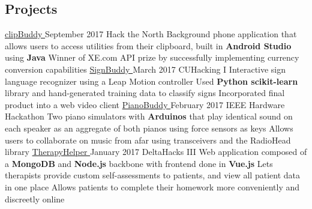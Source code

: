 \documentclass[]{aanguyen_res}
\begin{document}
\begin{main}
		\section{Projects}
			\mainentry%
				{\href{http://github.com/kumailn/clipBuddy}{clipBuddy {\faGithub}}}%
				{September 2017}%
				{Hack the North}%
				{}%
				{\faCaretRight Background phone application that allows users to access utilities from their clipboard, built in \textbf{Android Studio} using \textbf{Java}
				\faCaretRight Winner of XE.com API prize by successfully implementing currency conversion capabilities}
			\vspace{0.1cm}%
			\mainentry%
				{\href{http://github.com/aanguyen/SignBuddy}{SignBuddy {\faGithub}}}%
				{March 2017}%
				{CUHacking I}%
				{}%
				{\faCaretRight Interactive sign language recognizer using a Leap Motion controller 
				\faCaretRight Used \textbf{Python scikit-learn} library and hand-generated training data to classify signs
				\faCaretRight Incorporated final product into a web video client}
			\vspace{0.1cm}%
			\mainentry%
				{\href{http://github.com/aanguyen/collaboPiano}{PianoBuddy {\faGithub}}}%
				{February 2017}%
				{IEEE Hardware Hackathon}%
				{}%
				{\faCaretRight Two piano simulators with \textbf{Arduinos} that play identical sound on each speaker as an aggregate of both pianos using force sensors as keys
				\faCaretRight Allows users to collaborate on music from afar using transceivers and the RadioHead library}
			\vspace{0.1cm}%
			\mainentry%
				{\href{http://github.com/dtong1113/TherapyHelper}{TherapyHelper {\faGithub}}}%
				{January 2017}%
				{DeltaHacks III}%
				{}%
				{\faCaretRight Web application composed of a \textbf{MongoDB} and \textbf{Node.js} backbone with frontend done in \textbf{Vue.js}
				\faCaretRight Lets therapists provide custom self-assessments to patients, and view all patient data in one place
				\faCaretRight Allows patients to complete their homework more conveniently and discreetly online}

\end{main}
\end{document}

